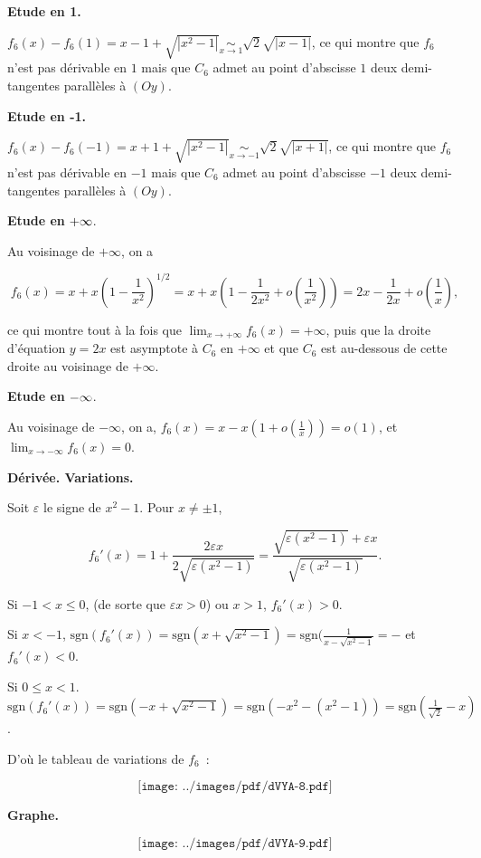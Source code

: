 {\begin{enumerate}
{{{{{{\textbf{Etude en 1.}

$f_6(x)-f_6(1)=x-1+\sqrt{|x^2-1|}\underset{x\rightarrow1}{\sim}\sqrt{2}\sqrt{|x-1|}$, ce qui montre que $f_6$ n'est pas dérivable en $1$ mais que $C_6$ admet au point d'abscisse $1$ deux demi-tangentes parallèles à $(Oy)$.

\textbf{Etude en -1.}

$f_6(x)-f_6(-1)=x+1+\sqrt{|x^2-1|}\underset{x\rightarrow-1}{\sim}\sqrt{2}\sqrt{|x+1|}$,  ce qui montre que $f_6$ n'est pas dérivable en $-1$ mais que $C_6$ admet au point d'abscisse $-1$ deux demi-tangentes parallèles à $(Oy)$.

\textbf{Etude en} $\bf{+{\infty}}$.

Au voisinage de $+\infty$, on a

$$f_6(x)=x+x(1-\frac{1}{x^2})^{1/2}=x+x(1-\frac{1}{2x^2}+o(\frac{1}{x^2}))=2x-\frac{1}{2x}+o(\frac{1}{x}),$$

ce qui montre tout à la fois que $\lim_{x\rightarrow +\infty}f_6(x)=+\infty$, puis que la droite d'équation $y=2x$ est asymptote à $C_6$ en $+\infty$ et que $C_6$ est au-dessous de cette droite au voisinage de $+\infty$.

\textbf{Etude en} $\bf{-{\infty}}$.

Au voisinage de $-\infty$, on a, $f_6(x)=x-x(1+o(\frac{1}{x}))=o(1)$, et $\lim_{x\rightarrow -\infty}f_6(x)=0$.

\textbf{Dérivée. Variations.}

Soit $\varepsilon$ le signe de $x^2-1$. Pour $x\neq\pm1$, 

$$f_6'(x)=1+\frac{2\varepsilon x}{2\sqrt{\varepsilon(x^2-1)}}=\frac{\sqrt{\varepsilon(x^2-1)}+\varepsilon x}{\sqrt{\varepsilon(x^2-1)}}.$$

Si $-1<x\leq0$, (de sorte que $\varepsilon x>0$) ou $x>1$, $f_6'(x)>0$.

Si $x<-1$, $\mbox{sgn}(f_6'(x))=\mbox{sgn}(x+\sqrt{x^2-1})=\mbox{sgn}(\frac{1}{x-\sqrt{x^2-1}}=-$ et $f_6'(x)<0$.

Si $0\leq x<1$. $\mbox{sgn}(f_6'(x))=\mbox{sgn}(-x+\sqrt{x^2-1})=\mbox{sgn}(-x^2-(x^2-1))=\mbox{sgn}(\frac{1}{\sqrt{2}}-x)$.

D'où le tableau de variations de $f_6$~:

$$\texttt{[image: ../images/pdf/dVYA-8.pdf]}$$



\textbf{Graphe.}

$$\texttt{[image: ../images/pdf/dVYA-9.pdf]}$$



}}}}}}
\end{enumerate}}
